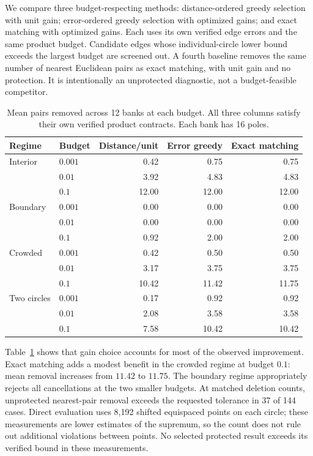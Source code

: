 \documentclass[11pt]{article}
\theoremstyle{definition}\newtheorem{definition}[theorem]{Definition}
\begin{document}
We compare three budget-respecting methods: distance-ordered greedy selection with unit gain; error-ordered greedy selection with optimized gains; and exact matching with optimized gains. Each uses its own verified edge errors and the same product budget. Candidate edges whose individual-circle lower bound exceeds the largest budget are screened out. A fourth baseline removes the same number of nearest Euclidean pairs as exact matching, with unit gain and no protection. It is intentionally an unprotected diagnostic, not a budget-feasible competitor.

\begin{table}[t]\centering\small
\caption{Mean pairs removed across 12 banks at each budget. All three columns satisfy their own verified product contracts. Each bank has 16 poles.}\label{tab:banks}
\begin{tabular}{llrrr}\toprule
Regime & Budget & Distance/unit & Error greedy & Exact matching\\\midrule
Interior & $0.001$ & 0.42 & 0.75 & 0.75\\
 & $0.01$ & 3.92 & 4.83 & 4.83\\
 & $0.1$ & 12.00 & 12.00 & 12.00\\
Boundary & $0.001$ & 0.00 & 0.00 & 0.00\\
 & $0.01$ & 0.00 & 0.00 & 0.00\\
 & $0.1$ & 0.92 & 2.00 & 2.00\\
Crowded & $0.001$ & 0.42 & 0.50 & 0.50\\
 & $0.01$ & 3.17 & 3.75 & 3.75\\
 & $0.1$ & 10.42 & 11.42 & 11.75\\
Two circles & $0.001$ & 0.17 & 0.92 & 0.92\\
 & $0.01$ & 2.08 & 3.58 & 3.58\\
 & $0.1$ & 7.58 & 10.42 & 10.42\\\bottomrule
\end{tabular}
\end{table}

Table~\ref{tab:banks} shows that gain choice accounts for most of the observed improvement. Exact matching adds a modest benefit in the crowded regime at budget $0.1$: mean removal increases from $11.42$ to $11.75$. The boundary regime appropriately rejects all cancellations at the two smaller budgets. At matched deletion counts, unprotected nearest-pair removal exceeds the requested tolerance in 37 of 144 cases. Direct evaluation uses 8,192 shifted equispaced points on each circle; these measurements are lower estimates of the supremum, so the count does not rule out additional violations between points. No selected protected result exceeds its verified bound in these measurements.
\end{document}

